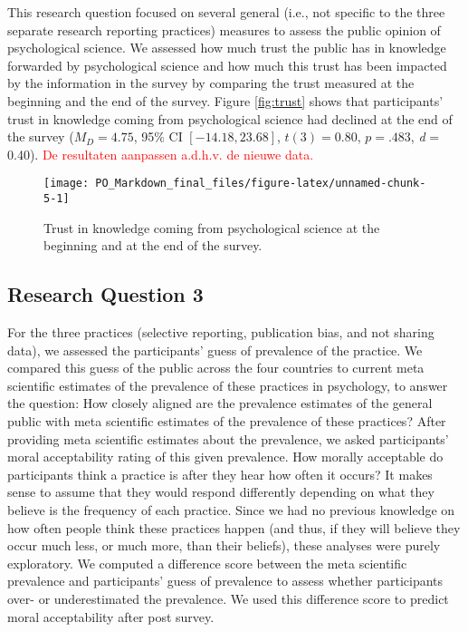 \documentclass[
  man,floatsintext]{apa7}
\begin{document}
This research question focused on several general (i.e., not specific to the three
separate research reporting practices) measures to assess the public opinion of psychological
science.
We assessed how much trust the public has in knowledge forwarded by
psychological science and how much this trust has been impacted by the information in the
survey by comparing the trust measured at the beginning and the end of the survey.
Figure \ref{fig:trust} shows that participants' trust in knowledge
coming from psychological science had declined at the end of the survey
(\(M_D = 4.75\), 95\% CI \([-14.18, 23.68]\), \(t(3) = 0.80\), \(p = .483\), \emph{d} = 0.40). \textcolor{red}{De resultaten aanpassen a.d.h.v. de nieuwe data.}

\begin{figure}
\texttt{[image: PO\_Markdown\_final\_files/figure-latex/unnamed-chunk-5-1]} \caption{Trust in knowledge coming from psychological science at the beginning and at the end of the survey.\label{fig:trust}}\label{fig:unnamed-chunk-5}
\end{figure}

\hypertarget{research-question-3}{%
\subsection{Research Question 3}\label{research-question-3}}

For the three practices (selective reporting, publication bias, and
not sharing data), we assessed the participants' guess of
prevalence of the practice. We compared this guess of the public across the four countries
to current meta scientific estimates of the prevalence of these
practices in psychology, to answer the question: How closely aligned are
the prevalence estimates of the general public with meta scientific
estimates of the prevalence of these practices? After providing meta
scientific estimates about the prevalence, we asked participants'
moral acceptability rating of this given prevalence. How morally
acceptable do participants think a practice is after they hear how often
it occurs? It makes sense to assume that they would respond differently
depending on what they believe is the frequency of each practice. Since
we had no previous knowledge on how often people think these practices
happen (and thus, if they will believe they occur much less, or much
more, than their beliefs), these analyses were purely exploratory. We
computed a difference score between the meta scientific prevalence and
participants' guess of prevalence to assess whether participants over-
or underestimated the prevalence. We used this difference score to
predict moral acceptability after post survey.
\end{document}
